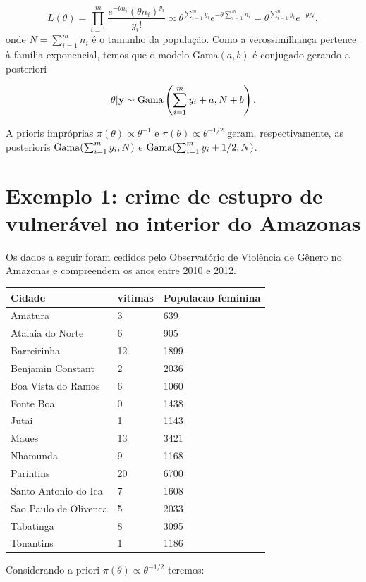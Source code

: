 \documentclass[
  letterpaper,
  DIV=11,
  numbers=noendperiod]{scrreprt}
\theoremstyle{definition}
\theoremstyle{definition}
\theoremstyle{plain}
\theoremstyle{remark}
\begin{document}
\[L(\theta)=\prod_{i=1}^m\frac{e^{-\theta n_i}(\theta n_i)^{y_i}}{y_i!}\varpropto \theta^{\sum_{i=1}^m y_i}e^{-\theta \sum_{i=1}^m n_i}=\theta^{\sum_{i=1}^n y_i}e^{-\theta N},\]
onde \(N=\sum_{i=1}^m n_i\) é o tamanho da população. Como a
verossimilhança pertence à família exponencial, temos que o modelo
Gama\((a,b)\) é conjugado gerando a posteriori

\[\theta|\mathbf{y}\sim\hbox{Gama}\left(\sum_{i=1}^{m}y_i+a,N+b\right).\]

A prioris impróprias \(\pi(\theta)\varpropto \theta^{-1}\) e
\(\pi(\theta)\varpropto \theta^{-1/2}\) geram, respectivamente, as
posterioris \(\hbox{Gama}(\sum_{i=1}^m y_i,N)\) e
\(\hbox{Gama}(\sum_{i=1}^m y_i+1/2,N)\).

\section{Exemplo 1: crime de estupro de vulnerável no interior do
Amazonas}\label{exemplo-1-crime-de-estupro-de-vulneruxe1vel-no-interior-do-amazonas}

Os dados a seguir foram cedidos pelo Observatório de Violência de Gênero
no Amazonas e compreendem os anos entre 2010 e 2012.

\begin{longtable}[]{@{}lll@{}}
\toprule\noalign{}
Cidade & vitimas & Populacao feminina \\
\midrule\noalign{}
\endhead
\bottomrule\noalign{}
\endlastfoot
Amatura & 3 & 639 \\
Atalaia do Norte & 6 & 905 \\
Barreirinha & 12 & 1899 \\
Benjamin Constant & 2 & 2036 \\
Boa Vista do Ramos & 6 & 1060 \\
Fonte Boa & 0 & 1438 \\
Jutai & 1 & 1143 \\
Maues & 13 & 3421 \\
Nhamunda & 9 & 1168 \\
Parintins & 20 & 6700 \\
Santo Antonio do Ica & 7 & 1608 \\
Sao Paulo de Olivenca & 5 & 2033 \\
Tabatinga & 8 & 3095 \\
Tonantins & 1 & 1186 \\
\end{longtable}

Considerando a priori \(\pi(\theta)\varpropto \theta^{-1/2}\) teremos:
\end{document}
